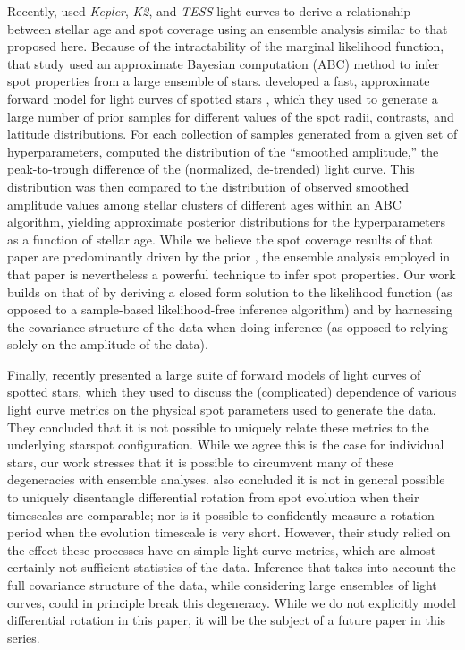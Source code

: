 \documentclass[modern,linenumbers]{aastex62}
\begin{document}
Recently, \citet{Morris2020} used \emph{Kepler}, \emph{K2}, and \emph{TESS}
light curves to derive a relationship between stellar age and spot
coverage using an ensemble analysis similar to that proposed here.
Because of the intractability of the marginal likelihood function,
that study used an approximate Bayesian computation (ABC) method to
infer spot properties from a large ensemble of stars. \citet{Morris2020}
developed a fast, approximate forward model for light curves of spotted stars
\citep[\textsf{fleck};][]{Morris2020b}, which they used to generate a large
number of prior samples for different values of the spot radii, contrasts,
and latitude distributions. For each collection of samples generated from a
given set of hyperparameters, \citet{Morris2020} computed the distribution of
the ``smoothed amplitude,''
the peak-to-trough difference of the (normalized, de-trended) light curve.
This distribution was then compared to the distribution of observed
smoothed amplitude values among stellar clusters of different ages
within an ABC algorithm, yielding approximate
posterior distributions for the hyperparameters as a function of
stellar age.
%
While we believe the spot coverage results of that paper are predominantly driven
by the prior \citep[due to the strong degeneracy between the spot contrast
    and the number of spots; see \S4.2 in][]{PaperI},
%
the ensemble analysis employed in that paper is nevertheless a powerful technique
to infer spot properties.
%
Our work builds on that of \citet{Morris2020} by deriving a closed form
solution to the likelihood function (as opposed to a sample-based
likelihood-free inference algorithm) and by harnessing the covariance
structure of the data when doing inference (as opposed to relying solely
on the amplitude of the data).

Finally, \citet{Basri2020} recently presented a large suite of forward models of light curves of
spotted stars, which they used to discuss the (complicated) dependence of
various light curve metrics on
the physical spot parameters used to generate the data. They concluded that it
is not possible to uniquely relate these metrics to the underlying starspot
configuration. While we agree this is the case for individual stars, our work
stresses that it is possible to circumvent many of these degeneracies with
ensemble analyses.
%
\citet{Basri2020} also concluded it is not in general possible to
uniquely disentangle differential rotation from spot evolution when their
timescales are comparable; nor is it possible to confidently measure a rotation
period when the evolution timescale is very short. However, their study
relied on the effect these processes have on simple light curve metrics,
which are almost certainly not sufficient statistics of the data. Inference
that takes into account the full covariance structure of the data, while
considering large ensembles of light curves, could in principle break
this degeneracy. While we do not explicitly model differential rotation in
this paper, it will be the subject of a future paper in this series.
\end{document}
